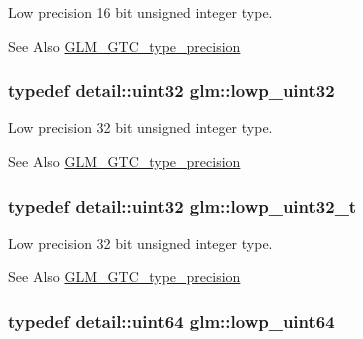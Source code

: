 Low precision 16 bit unsigned integer type. \begin{DoxySeeAlso}{See Also}
\hyperlink{group__gtc__type__precision}{G\-L\-M\-\_\-\-G\-T\-C\-\_\-type\-\_\-precision} 
\end{DoxySeeAlso}
\hypertarget{group__gtc__type__precision_gaf11e85af414720b4cd12bd57b3a81e68}{
\subsubsection[{lowp\-\_\-uint32}]{\setlength{\rightskip}{0pt plus 5cm}typedef detail\-::uint32 {\bf glm\-::lowp\-\_\-uint32}}}\label{group__gtc__type__precision_gaf11e85af414720b4cd12bd57b3a81e68}
Low precision 32 bit unsigned integer type. \begin{DoxySeeAlso}{See Also}
\hyperlink{group__gtc__type__precision}{G\-L\-M\-\_\-\-G\-T\-C\-\_\-type\-\_\-precision} 
\end{DoxySeeAlso}
\hypertarget{group__gtc__type__precision_ga9f8cb602a358e1f48bda2682cf051f0c}{
\subsubsection[{lowp\-\_\-uint32\-\_\-t}]{\setlength{\rightskip}{0pt plus 5cm}typedef detail\-::uint32 {\bf glm\-::lowp\-\_\-uint32\-\_\-t}}}\label{group__gtc__type__precision_ga9f8cb602a358e1f48bda2682cf051f0c}
Low precision 32 bit unsigned integer type. \begin{DoxySeeAlso}{See Also}
\hyperlink{group__gtc__type__precision}{G\-L\-M\-\_\-\-G\-T\-C\-\_\-type\-\_\-precision} 
\end{DoxySeeAlso}
\hypertarget{group__gtc__type__precision_gacf666a9d9b309c4615c7a4f2ab0be289}{
\subsubsection[{lowp\-\_\-uint64}]{\setlength{\rightskip}{0pt plus 5cm}typedef detail\-::uint64 {\bf glm\-::lowp\-\_\-uint64}}}\label{group__gtc__type__precision_gacf666a9d9b309c4615c7a4f2ab0be289}
